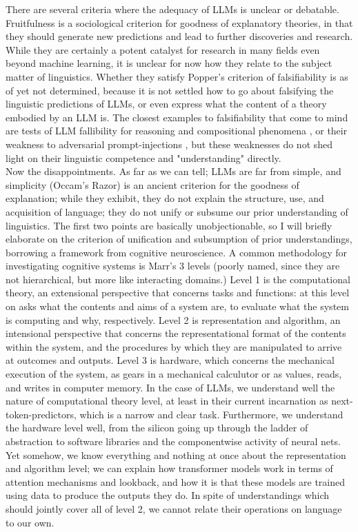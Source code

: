 There are several criteria where the adequacy of LLMs is unclear or debatable. Fruitfulness is a sociological criterion for goodness of explanatory theories, in that they should generate new predictions and lead to further discoveries and research. While they are certainly a potent catalyst for research in many fields even beyond machine learning, it is unclear for now how they relate to the subject matter of linguistics. Whether they satisfy Popper's criterion of falsifiability is as of yet not determined, because it is not settled how to go about falsifying the linguistic predictions of LLMs, or even express what the content of a theory embodied by an LLM is. The closest examples to falsifiability that come to mind are tests of LLM fallibility for reasoning and compositional phenomena \citep{dziriFaithFateLimits2023}, or their weakness to adversarial prompt-injections \citep{RileyGoodsideGoodside2022}, but these weaknesses do not shed light on their linguistic competence and "understanding" directly.\\

Now the disappointments. As far as we can tell; LLMs are far from simple, and simplicity (Occam's Razor) is an ancient criterion for the goodness of explanation; while they exhibit, they do not explain the structure, use, and acquisition of language; they do not unify or subsume our prior understanding of linguistics. The first two points are basically unobjectionable, so I will briefly elaborate on the criterion of unification and subsumption of prior understandings, borrowing a framework from cognitive neuroscience. A common methodology for investigating cognitive systems is Marr's 3 levels \citep{marrVisionComputationalInvestigation2010} (poorly named, since they are not hierarchical, but more like interacting domains.) Level 1 is the computational theory, an extensional perspective that concerns tasks and functions: at this level on asks what the contents and aims of a system are, to evaluate what the system is computing and why, respectively. Level 2 is representation and algorithm, an intensional perspective that concerns the representational format of the contents within the system, and the procedures by which they are manipulated to arrive at outcomes and outputs. Level 3 is hardware, which concerns the mechanical execution of the system, as gears in a mechanical calculutor or as values, reads, and writes in computer memory. In the case of LLMs, we understand well the nature of computational theory level, at least in their current incarnation as next-token-predictors, which is a narrow and clear task. Furthermore, we understand the hardware level well, from the silicon going up through the ladder of abstraction to software libraries and the componentwise activity of neural nets. Yet somehow, we know everything and nothing at once about the representation and algorithm level; we can explain how transformer models work in terms of attention mechanisms and lookback, and how it is that these models are trained using data to produce the outputs they do. In spite of understandings which should jointly cover all of level 2, we cannot relate their operations on language to our own.

